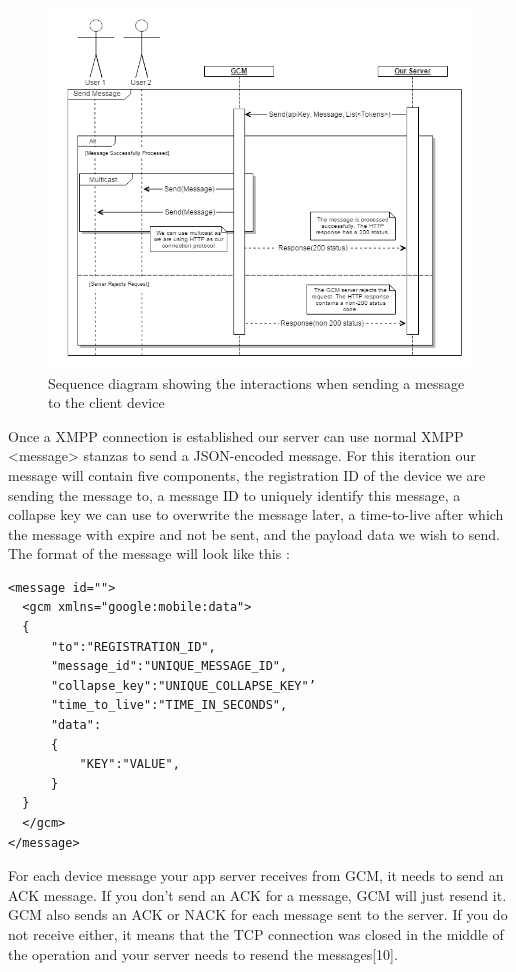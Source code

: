 \documentclass{article}
\begin{document}
	\begin{figure}[H]
		\centering
		\includegraphics[width=1\textwidth]{"GCM Send Message Sequence Diagram - Iteration 0"}
		\caption{Sequence diagram showing the interactions when sending a message to the client device}
	\end{figure}
	
	Once a XMPP connection is established our server can use normal XMPP <message> stanzas to send a JSON-encoded message. For this iteration our message will contain five components, the registration ID of the device we are sending the message to, a message ID to uniquely identify this message, a collapse key we can use to overwrite the message later, a time-to-live after which the message with expire and not be sent, and the payload data we wish to send. The format of the message will look like this :
	\begin{lstlisting}
<message id="">
  <gcm xmlns="google:mobile:data">
  {
      "to":"REGISTRATION_ID",
      "message_id":"UNIQUE_MESSAGE_ID",
      "collapse_key":"UNIQUE_COLLAPSE_KEY"’
      "time_to_live":"TIME_IN_SECONDS",
      "data":
      {
          "KEY":"VALUE",
      }
  }
  </gcm>
</message>

	\end{lstlisting}
	For each device message your app server receives from GCM, it needs to send an ACK message. If you don't send an ACK for a message, GCM will just resend it. GCM also sends an ACK or NACK for each message sent to the server. If you do not receive either, it means that the TCP connection was closed in the middle of the operation and your server needs to resend the messages[10]. \\
\end{document}
